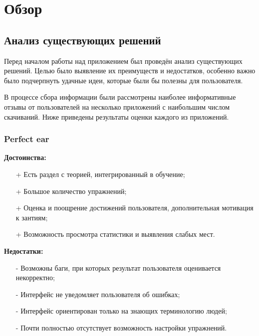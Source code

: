\chapter{Обзор}
\section{Анализ существующих решений}
Перед началом работы над приложением был проведён анализ существующих решений. Целью было выявление их преимуществ и недостатков, особенно важно было подчерпнуть удачные идеи, которые были бы полезны для пользователя. \par
В процессе сбора информации были рассмотрены наиболее информативные отзывы от пользователей на несколько приложений с наибольшим числом скачиваний. Ниже приведены результаты оценки каждого из приложений.

\subsection[Perfect ear]{Perfect ear\cite{Apps1}}
\begin{minipage}[t]{0.45\textwidth}
\textbf{Достоинства:}
\begin{itemize}
  \item[+] Есть раздел с теорией, интегрированный в обучение;
  \item[+] Большое количество упражнений;
  \item[+] Оценка и поощрение достижений пользователя, дополнительная мотивация к зантиям;
  \item[+] Возможность просмотра статистики и выявления слабых мест.
\end{itemize}
\end{minipage}
\hfill
\begin{minipage}[t]{0.45\textwidth}
\textbf{Недостатки:}
\begin{itemize}
  \item[-] Возможны баги, при которых результат пользователя оценивается некорректно;
  \item[-] Интерфейс не уведомляет пользователя об ошибках;
  \item[-] Интерфейс ориентирован только на знающих терминологию людей;
  \item[-] Почти полностью отсутствует возможность настройки упражнений.
\end{itemize}
\end{minipage} 

